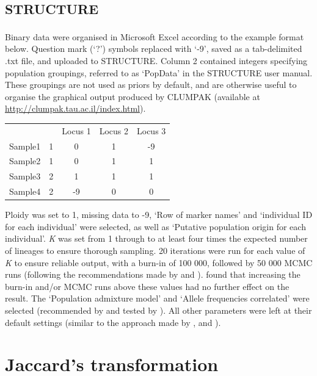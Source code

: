\subsection{STRUCTURE}
\label{appendix:structure_settings}

Binary data were organised in Microsoft Excel\textsuperscript{\textregistered} according to the example format below. Question mark (`?') symbols replaced with `-9', saved as a tab-delimited .txt file, and uploaded to STRUCTURE. Column 2 contained integers specifying population groupings, referred to as `PopData' in the STRUCTURE user manual. These groupings are not used as priors by default, and are otherwise useful to organise the graphical output produced by CLUMPAK \citep{Kopelman2015} (available at \url{http://clumpak.tau.ac.il/index.html}). \\

\begin{table}[H]
\centering
\begin{tabular}{@{}llccc@{}}
 &  & Locus 1 & Locus 2 & Locus 3 \\
Sample1 & 1 & 0 & 1 & -9 \\
Sample2 & 1 & 0 & 1 & 1 \\
Sample3 & 2 & 1 & 1 & 1 \\
Sample4 & 2 & -9 & 0 & 0
\end{tabular}
\end{table}

Ploidy was set to 1, missing data to -9, `Row of marker names' and `individual ID for each individual' were selected, as well as `Putative population origin for each individual'. \textit{K} was set from 1 through to at least four times the expected number of lineages to ensure thorough sampling. 20 iterations were run for each value of \textit{K} to ensure reliable output, with a burn-in of 100 000, followed by 50 000 MCMC runs (following the recommendations made by \citet{wang2017computer} and \citet{puechmaille2016program}). \citet{puechmaille2016program} found that increasing the burn-in and/or MCMC runs above these values had no further effect on the result. The `Population admixture model' and `Allele frequencies correlated' were selected (recommended by \citet{falush2003inference} and tested by \citet{puechmaille2016program}). All other parameters were left at their default settings (similar to the approach made by \citet{Sutton2017GeneticAgents}, and \citet{medrano2014population}).

\section{Jaccard's transformation}
\label{appendix:jaccards_transformation}

